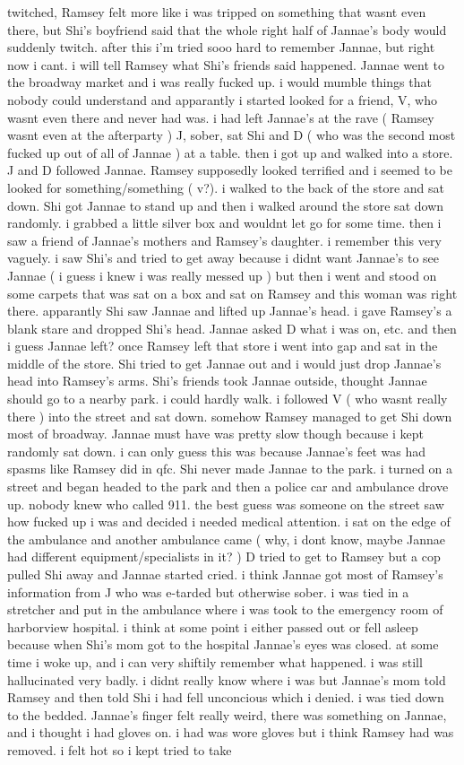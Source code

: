 \documentclass[12pt]{book}
\begin{document}
twitched, Ramsey felt more like i was tripped on something that wasnt even there, but Shi's boyfriend said that the whole right half of Jannae's body would suddenly twitch. after this i'm tried sooo hard to remember Jannae, but right now i cant. i will tell Ramsey what Shi's friends said happened. Jannae went to the broadway market and i was really fucked up. i would mumble things that nobody could understand and apparantly i started looked for a friend, V, who wasnt even there and never had was. i had left Jannae's at the rave ( Ramsey wasnt even at the afterparty ) J, sober, sat Shi and D ( who was the second most fucked up out of all of Jannae ) at a table. then i got up and walked into a store. J and D followed Jannae. Ramsey supposedly looked terrified and i seemed to be looked for something/something ( v?). i walked to the back of the store and sat down. Shi got Jannae to stand up and then i walked around the store sat down randomly. i grabbed a little silver box and wouldnt let go for some time. then i saw a friend of Jannae's mothers and Ramsey's daughter. i remember this very vaguely. i saw Shi's and tried to get away because i didnt want Jannae's to see Jannae ( i guess i knew i was really messed up ) but then i went and stood on some carpets that was sat on a box and sat on Ramsey and this woman was right there. apparantly Shi saw Jannae and lifted up Jannae's head. i gave Ramsey's a blank stare and dropped Shi's head. Jannae asked D what i was on, etc. and then i guess Jannae left? once Ramsey left that store i went into gap and sat in the middle of the store. Shi tried to get Jannae out and i would just drop Jannae's head into Ramsey's arms. Shi's friends took Jannae outside, thought Jannae should go to a nearby park. i could hardly walk. i followed V ( who wasnt really there ) into the street and sat down. somehow Ramsey managed to get Shi down most of broadway. Jannae must have was pretty slow though because i kept randomly sat down. i can only guess this was because Jannae's feet was had spasms like Ramsey did in qfc. Shi never made Jannae to the park. i turned on a street and began headed to the park and then a police car and ambulance drove up. nobody knew who called 911. the best guess was someone on the street saw how fucked up i was and decided i needed medical attention. i sat on the edge of the ambulance and another ambulance came ( why, i dont know, maybe Jannae had different equipment/specialists in it? ) D tried to get to Ramsey but a cop pulled Shi away and Jannae started cried. i think Jannae got most of Ramsey's information from J who was e-tarded but otherwise sober. i was tied in a stretcher and put in the ambulance where i was took to the emergency room of harborview hospital. i think at some point i either passed out or fell asleep because when Shi's mom got to the hospital Jannae's eyes was closed. at some time i woke up, and i can very shiftily remember what happened. i was still hallucinated very badly. i didnt really know where i was but Jannae's mom told Ramsey and then told Shi i had fell unconcious which i denied. i was tied down to the bedded. Jannae's finger felt really weird, there was something on Jannae, and i thought i had gloves on. i had was wore gloves but i think Ramsey had was removed. i felt hot so i kept tried to take 
\end{document}
